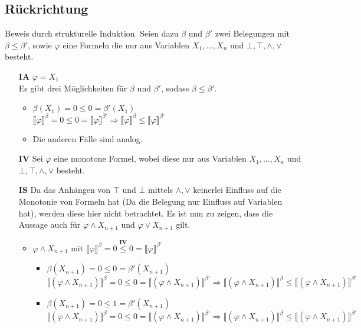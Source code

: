 \documentclass[a4paper,10pt]{article}
\begin{document}
\subsection*{Rückrichtung}
Beweis durch strukturelle Induktion. Seien dazu $\beta$ und $\beta'$ zwei Belegungen mit $\beta \leq \beta'$, sowie $\varphi$ eine Formeln die nur aus Variablen $X_1,...,X_n$ und $\bot,\top,\land,\lor$ besteht.
\begin{itemize}
\item[\textbf{IA}] $\varphi = X_1$ \\ 
Es gibt drei Möglichkeiten für $\beta$ und $\beta'$, sodass $\beta \leq \beta'$.
\begin{itemize}
\item $\beta(X_1) = 0 \leq  0 = \beta'(X_1)$ \\
$\llbracket \varphi \rrbracket^{\beta} = 0 \leq 0 = \llbracket \varphi \rrbracket^{\beta'} \Rightarrow \llbracket \varphi \rrbracket^{\beta} \leq \llbracket \varphi \rrbracket^{\beta'} $
\item Die anderen Fälle sind analog.
\end{itemize}
\item[\textbf{IV}] Sei $\varphi$ eine monotone Formel, wobei diese nur aus Variablen $X_1,...,X_n$ und $\bot,\top,\land,\lor$ besteht.
\item[\textbf{IS}] Da das Anhängen von $\top$ und $\bot$ mittels $\land, \lor$ keinerlei Einfluss auf die Monotonie von Formeln hat (Da die Belegung nur Einfluss auf Variablen hat), werden diese hier nicht betrachtet. Es ist nun zu zeigen, dass die Aussage auch für $\varphi \land X_{n+1}$ und $\varphi \lor X_{n+1}$ gilt.
\begin{itemize}
\item $\varphi \land X_{n+1}$ mit $\llbracket \varphi \rrbracket^{\beta} = 0 \stackrel{\textbf{IV}}{\leq} 0 = \llbracket \varphi \rrbracket^{\beta'}$ 
\begin{itemize}
\item $\beta(X_{n+1}) = 0 \leq 0 = \beta'(X_{n+1})$ \\
$\llbracket (\varphi \land X_{n+1}) \rrbracket^{\beta} = 0 \leq 0 = \llbracket (\varphi \land X_{n+1})  \rrbracket^{\beta'} \Rightarrow \llbracket (\varphi \land X_{n+1})  \rrbracket^{\beta} \leq \llbracket (\varphi \land X_{n+1})  \rrbracket^{\beta'} $
\item $\beta(X_{n+1}) = 0 \leq 1 = \beta'(X_{n+1})$ \\
$\llbracket (\varphi \land X_{n+1}) \rrbracket^{\beta} = 0 \leq 0 = \llbracket (\varphi \land X_{n+1})  \rrbracket^{\beta'} \Rightarrow \llbracket (\varphi \land X_{n+1})  \rrbracket^{\beta} \leq \llbracket (\varphi \land X_{n+1})  \rrbracket^{\beta'} $

\end{itemize}
\end{itemize}
\end{itemize}
\end{document}
